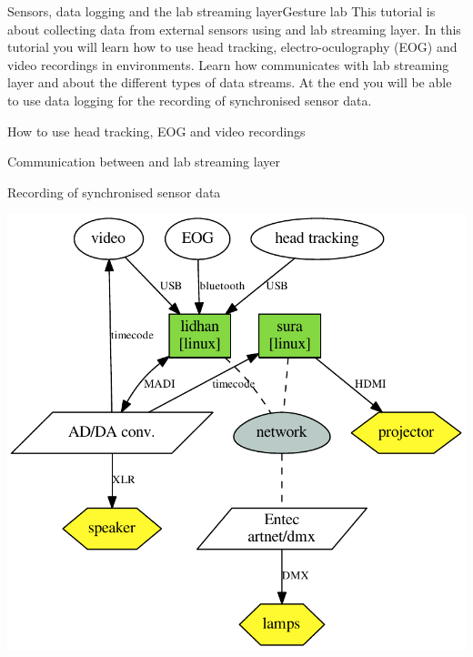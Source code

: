 \documentclass[11pt,a4paper,twoside]{article}
\begin{document}
\setcounter{tutorial}{0}
\begin{tutorial}{Sensors, data logging and the lab streaming layer}{Gesture lab}
This tutorial is about collecting data from external sensors using
\tascar{} and lab streaming layer.
%
In this tutorial you will learn how to use head tracking,
electro-oculography (EOG) and video recordings in \tascar{}
environments.
%
Learn how \tascar{} communicates with lab streaming layer and about
the different types of data streams.
%
At the end you will be able to use \tascar{} data logging for the
recording of synchronised sensor data.

  \begin{learnitems}
  \item How to use head tracking, EOG and video recordings
  \item Communication between \tascar{} and lab streaming layer
  \end{learnitems}

  \begin{appitems}
  \item Recording of synchronised sensor data
  \end{appitems}

  \centerline{\includegraphics[width=0.5\columnwidth]{tutorial1_hardware}}
\end{tutorial}

\ifshowtutorial
\end{document}
